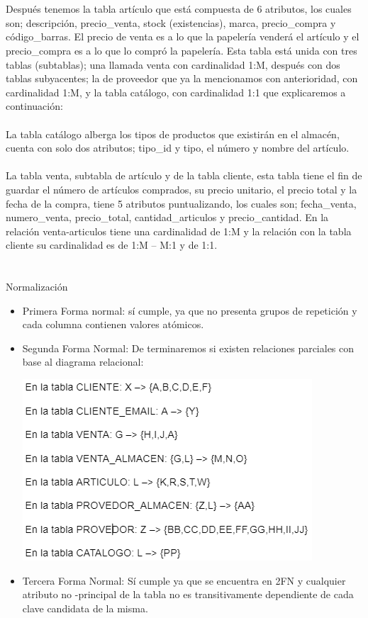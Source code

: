 \documentclass[letter,12pt]{article} %
\begin{document}
\\\\
Después tenemos la tabla artículo que está compuesta de 6 atributos, los cuales son; descripción, precio\_venta, stock (existencias), marca, precio\_compra y código\_barras. El precio de venta es a lo que la papelería venderá el artículo y el precio\_compra es a lo que lo compró la papelería. Esta tabla está unida con tres tablas (subtablas); una llamada venta con cardinalidad 1:M, después con dos tablas subyacentes; la de proveedor que ya la mencionamos con anterioridad, con cardinalidad 1:M,  y la tabla catálogo, con cardinalidad 1:1 que explicaremos a continuación:
\\\\
La tabla catálogo alberga los tipos de productos que existirán en el almacén, cuenta con solo dos atributos; tipo\_id y tipo, el número y nombre del artículo.
\\\\
La tabla venta, subtabla de artículo y de la tabla cliente, esta tabla tiene el fin de guardar el número de artículos comprados, su precio unitario, el precio total  y la fecha de la compra, tiene 5 atributos puntualizando, los cuales son; fecha\_venta, numero\_venta, precio\_total, cantidad\_articulos y precio\_cantidad. En la relación venta-articulos tiene una cardinalidad de 1:M y la relación con la tabla cliente su cardinalidad es de 1:M – M:1 y de 1:1. 
\\\\\\
Normalización
\begin{itemize}
\item Primera Forma normal: sí cumple, ya que no presenta grupos de repetición y cada columna contienen valores atómicos.
\item Segunda Forma Normal: De terminaremos si existen relaciones parciales con base al diagrama relacional:
\begin{center} 
\includegraphics{imagenes/N.png}
\end{center}
\item Tercera Forma Normal: Sí cumple ya que se encuentra en 2FN y cualquier atributo no -principal de la tabla no es transitivamente dependiente de cada clave candidata de la misma. \\\\\\
\end{itemize}
\end{document}
